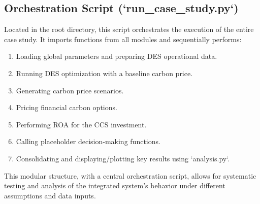 \subsection{Orchestration Script (`run_case_study.py`)}
Located in the root directory, this script orchestrates the execution of the entire case study. It imports functions from all modules and sequentially performs:
\begin{enumerate}
    \item Loading global parameters and preparing DES operational data.
    \item Running DES optimization with a baseline carbon price.
    \item Generating carbon price scenarios.
    \item Pricing financial carbon options.
    \item Performing ROA for the CCS investment.
    \item Calling placeholder decision-making functions.
    \item Consolidating and displaying/plotting key results using `analysis.py`.
\end{enumerate}
This modular structure, with a central orchestration script, allows for systematic testing and analysis of the integrated system's behavior under different assumptions and data inputs.


